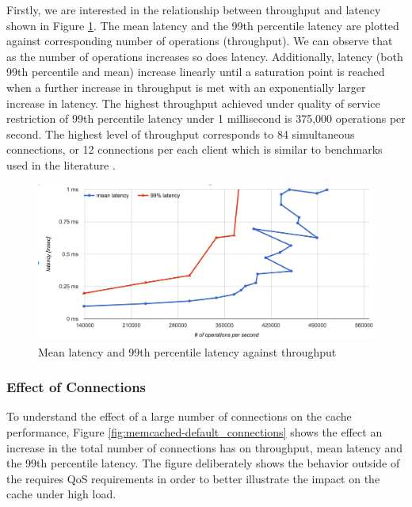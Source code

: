 Firstly, we are interested in the relationship between throughput and latency shown in Figure \ref{fig:memcached-default-latency-vs-ops}. The mean latency and the 99th percentile latency are plotted against corresponding number of operations (throughput). We can observe that as the number of operations increases so does latency. Additionally, latency (both 99th percentile and mean) increase linearly until a saturation point is reached when a further increase in throughput is met with an exponentially larger increase in latency. The highest throughput achieved under quality of service restriction of 99th percentile latency under 1 millisecond is 375,000 operations per second. The highest level of throughput corresponds to 84 simultaneous connections, or 12 connections per each client which is similar to benchmarks used in the literature \cite{lim2013thin}.

\begin{figure}[h]
    \includegraphics[width=\textwidth]{./res/5_default_latency_vs_ops.png}
    \caption{Mean latency and 99th percentile latency against throughput}
    \label{fig:memcached-default-latency-vs-ops}
\end{figure}


\subsubsection{Effect of Connections}
To understand the effect of a large number of connections on the cache performance, Figure \ref{fig:memcached-default_connections} shows the effect an increase in the total number of connections has on throughput, mean latency and the 99th percentile latency. The figure deliberately shows the behavior outside of the requires QoS requirements in order to better illustrate the impact on the cache under high load.

